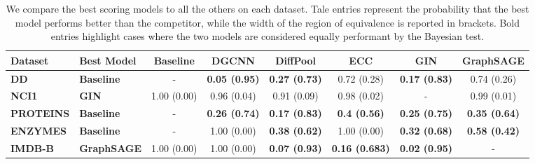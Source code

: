 \begin{table}[]

    \caption{We compare the best scoring models to all the others on each dataset. Tale entries represent the probability that the best model performs better than the competitor, while the width of the region of equivalence is reported in brackets. Bold entries highlight cases where the two models are considered equally performant by the Bayesian test.}
    \label{tab:classifier-comparison}
    \centering
    \begin{tabular}{@{}llcccccc@{}}
    \toprule
    \textbf{Dataset}        & \textbf{Best Model} & \multicolumn{1}{c}{\textbf{Baseline}} & \multicolumn{1}{c}{\textbf{DGCNN}} & \multicolumn{1}{c}{\textbf{DiffPool}} & \multicolumn{1}{c}{\textbf{ECC}} & \multicolumn{1}{c}{\textbf{GIN}} & \multicolumn{1}{c}{\textbf{GraphSAGE}} \\
    \midrule
    \textbf{DD} & \textbf{Baseline}              & -    & \textbf{0.05 {\scriptsize (0.95)}}  & \textbf{0.27 {\scriptsize (0.73)}}  & 0.72 {\scriptsize (0.28)}  & \textbf{0.17 {\scriptsize (0.83)}} & 0.74 {\scriptsize (0.26)} \\

    \textbf{NCI1} & \textbf{GIN}                 & 1.00 {\scriptsize (0.00)} & 0.96 {\scriptsize (0.04)} & 0.91 {\scriptsize (0.09)} & 0.98 {\scriptsize (0.02)}  & -     & 0.99 {\scriptsize (0.01)} \\

    \textbf{PROTEINS} & \textbf{Baseline}        & -    & \textbf{0.26 {\scriptsize (0.74)}}  & \textbf{0.17 {\scriptsize (0.83)}}  & \textbf{0.4 {\scriptsize (0.56)}}  & \textbf{0.25 {\scriptsize (0.75)}}  & \textbf{0.35 {\scriptsize (0.64)}} \\

    \textbf{ENZYMES} & \textbf{Baseline}         & -    & 1.00 {\scriptsize (0.00)}  & \textbf{0.38 {\scriptsize (0.62)}}  & 1.00 {\scriptsize (0.00)}  & \textbf{0.32 {\scriptsize (0.68)}}  & \textbf{0.58 {\scriptsize (0.42)}} \\

    \midrule

    \textbf{IMDB-B} & \textbf{GraphSAGE}         & 1.00 {\scriptsize (0.00)} & 1.00 {\scriptsize (0.00)}  & \textbf{0.07 {\scriptsize (0.93)}}  & \textbf{0.16 {\scriptsize (0.683)}}  & \textbf{0.02 {\scriptsize (0.95)}}  & -    \\


\end{tabular}
\end{table}
